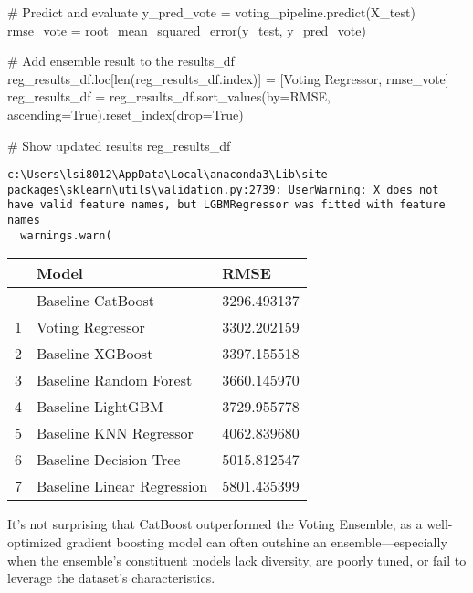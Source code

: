 \documentclass[
  letterpaper,
  DIV=11,
  numbers=noendperiod]{scrreprt}
\newenvironment{Shaded}{\begin{snugshade}}{\end{snugshade}}
\newcommand{\BuiltInTok}[1]{\textcolor[rgb]{0.00,0.23,0.31}{#1}}
\newcommand{\CommentTok}[1]{\textcolor[rgb]{0.37,0.37,0.37}{#1}}
\newcommand{\NormalTok}[1]{\textcolor[rgb]{0.00,0.23,0.31}{#1}}
\newcommand{\OperatorTok}[1]{\textcolor[rgb]{0.37,0.37,0.37}{#1}}
\newcommand{\StringTok}[1]{\textcolor[rgb]{0.13,0.47,0.30}{#1}}
\newcommand{\VariableTok}[1]{\textcolor[rgb]{0.07,0.07,0.07}{#1}}
\begin{document}
\begin{Shaded}
\begin{Highlighting}[]
\CommentTok{\# Predict and evaluate}
\NormalTok{y\_pred\_vote }\OperatorTok{=}\NormalTok{ voting\_pipeline.predict(X\_test)}
\NormalTok{rmse\_vote }\OperatorTok{=}\NormalTok{ root\_mean\_squared\_error(y\_test, y\_pred\_vote)}

\CommentTok{\# Add ensemble result to the results\_df}
\NormalTok{reg\_results\_df.loc[}\BuiltInTok{len}\NormalTok{(reg\_results\_df.index)] }\OperatorTok{=}\NormalTok{ [}\StringTok{\textquotesingle{}Voting Regressor\textquotesingle{}}\NormalTok{, rmse\_vote]}
\NormalTok{reg\_results\_df }\OperatorTok{=}\NormalTok{ reg\_results\_df.sort\_values(by}\OperatorTok{=}\StringTok{\textquotesingle{}RMSE\textquotesingle{}}\NormalTok{, ascending}\OperatorTok{=}\VariableTok{True}\NormalTok{).reset\_index(drop}\OperatorTok{=}\VariableTok{True}\NormalTok{)}

\CommentTok{\# Show updated results}
\NormalTok{reg\_results\_df}
\end{Highlighting}
\end{Shaded}

\begin{verbatim}
c:\Users\lsi8012\AppData\Local\anaconda3\Lib\site-packages\sklearn\utils\validation.py:2739: UserWarning: X does not have valid feature names, but LGBMRegressor was fitted with feature names
  warnings.warn(
\end{verbatim}

\begin{longtable}[]{@{}lll@{}}
\toprule\noalign{}
& Model & RMSE \\
\midrule\noalign{}
\endhead
\bottomrule\noalign{}
\endlastfoot
0 & Baseline CatBoost & 3296.493137 \\
1 & Voting Regressor & 3302.202159 \\
2 & Baseline XGBoost & 3397.155518 \\
3 & Baseline Random Forest & 3660.145970 \\
4 & Baseline LightGBM & 3729.955778 \\
5 & Baseline KNN Regressor & 4062.839680 \\
6 & Baseline Decision Tree & 5015.812547 \\
7 & Baseline Linear Regression & 5801.435399 \\
\end{longtable}

It's not surprising that CatBoost outperformed the Voting Ensemble, as a
well-optimized gradient boosting model can often outshine an
ensemble---especially when the ensemble's constituent models lack
diversity, are poorly tuned, or fail to leverage the dataset's
characteristics.
\end{document}
